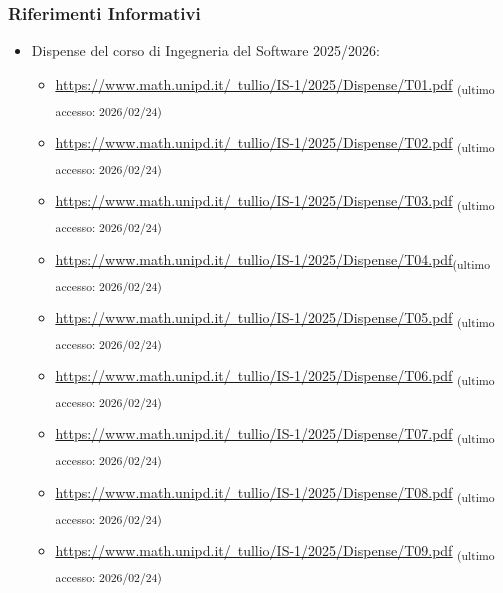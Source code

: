 \documentclass[a4paper,12pt]{article}
\newcommand{\ped}[1]{\textsubscript{#1}}
\begin{document}
\subsubsection{Riferimenti Informativi}
\begin{itemize}
    \item Dispense del corso di Ingegneria del Software 2025/2026:
          \begin{itemize}
            \item \href{https://www.math.unipd.it/~tullio/IS-1/2025/Dispense/T01.pdf}{\ul{https://www.math.unipd.it/~tullio/IS-1/2025/Dispense/T01.pdf}} \ped{(ultimo accesso: 2026/02/24)}
            \item \href{https://www.math.unipd.it/~tullio/IS-1/2025/Dispense/T02.pdf}{\ul{https://www.math.unipd.it/~tullio/IS-1/2025/Dispense/T02.pdf}} \ped{(ultimo accesso: 2026/02/24)}
            \item \href{https://www.math.unipd.it/~tullio/IS-1/2025/Dispense/T03.pdf}{\ul{https://www.math.unipd.it/~tullio/IS-1/2025/Dispense/T03.pdf}} \ped{(ultimo accesso: 2026/02/24)}
            \item \href{https://www.math.unipd.it/~tullio/IS-1/2025/Dispense/T04.pdf}{\ul{https://www.math.unipd.it/~tullio/IS-1/2025/Dispense/T04.pdf}}\ped{(ultimo accesso: 2026/02/24)}
            \item \href{https://www.math.unipd.it/~tullio/IS-1/2025/Dispense/T05.pdf}{\ul{https://www.math.unipd.it/~tullio/IS-1/2025/Dispense/T05.pdf}} \ped{(ultimo accesso: 2026/02/24)}
            \item \href{https://www.math.unipd.it/~tullio/IS-1/2025/Dispense/T06.pdf}{\ul{https://www.math.unipd.it/~tullio/IS-1/2025/Dispense/T06.pdf}} \ped{(ultimo accesso: 2026/02/24)}
            \item \href{https://www.math.unipd.it/~tullio/IS-1/2025/Dispense/T07.pdf}{\ul{https://www.math.unipd.it/~tullio/IS-1/2025/Dispense/T07.pdf}} \ped{(ultimo accesso: 2026/02/24)}
            \item \href{https://www.math.unipd.it/~tullio/IS-1/2025/Dispense/T08.pdf}{\ul{https://www.math.unipd.it/~tullio/IS-1/2025/Dispense/T08.pdf}} \ped{(ultimo accesso: 2026/02/24)}
            \item \href{https://www.math.unipd.it/~tullio/IS-1/2025/Dispense/T09.pdf}{\ul{https://www.math.unipd.it/~tullio/IS-1/2025/Dispense/T09.pdf}} \ped{(ultimo accesso: 2026/02/24)}

\end{itemize}
\end{itemize}
\end{document}
